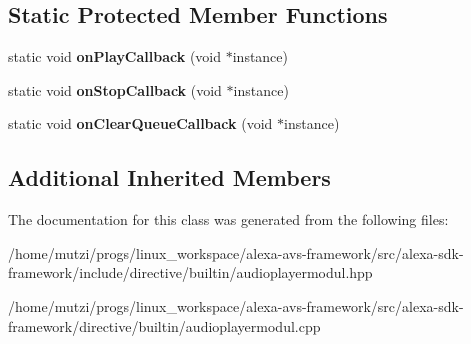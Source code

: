 \subsection*{Static Protected Member Functions}
\begin{DoxyCompactItemize}
\item 
\mbox{\label{classdirective_1_1AudioPlayerModul_afe89fcf854c51e4d502d9e9013f00ae6}} 
static void {\bfseries on\+Play\+Callback} (void $\ast$instance)
\item 
\mbox{\label{classdirective_1_1AudioPlayerModul_a030c94e120477907566b8d700a0c9128}} 
static void {\bfseries on\+Stop\+Callback} (void $\ast$instance)
\item 
\mbox{\label{classdirective_1_1AudioPlayerModul_ab28a2a28907e424932d31b565df681ae}} 
static void {\bfseries on\+Clear\+Queue\+Callback} (void $\ast$instance)
\end{DoxyCompactItemize}
\subsection*{Additional Inherited Members}


The documentation for this class was generated from the following files\+:\begin{DoxyCompactItemize}
\item 
/home/mutzi/progs/linux\+\_\+workspace/alexa-\/avs-\/framework/src/alexa-\/sdk-\/framework/include/directive/builtin/audioplayermodul.\+hpp\item 
/home/mutzi/progs/linux\+\_\+workspace/alexa-\/avs-\/framework/src/alexa-\/sdk-\/framework/directive/builtin/audioplayermodul.\+cpp\end{DoxyCompactItemize}
